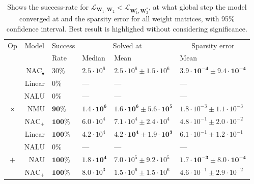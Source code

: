 \begin{table}[!h]

\caption{\label{tab:function-task-static-defaults}Shows the success-rate for $\mathcal{L}_{\mathbf{W}_1, \mathbf{W}_2} < \mathcal{L}_{\mathbf{W}_1^\epsilon, \mathbf{W}_2^*}$, at what global step the model converged at and the sparsity error for all weight matrices, with 95\% confidence interval. Best result is highlighed without considering significance.}
\centering
\begin{tabular}{crllll}
\toprule
\multicolumn{1}{c}{Op} & \multicolumn{1}{c}{Model} & \multicolumn{1}{c}{Success} & \multicolumn{2}{c}{Solved at} & \multicolumn{1}{c}{Sparsity error} \\
\cmidrule(l{3pt}r{3pt}){1-1} \cmidrule(l{3pt}r{3pt}){2-2} \cmidrule(l{3pt}r{3pt}){3-3} \cmidrule(l{3pt}r{3pt}){4-5} \cmidrule(l{3pt}r{3pt}){6-6}
 &  & Rate & Median & Mean & Mean\\
\midrule
 & $\mathrm{NAC}_{\bullet}$ & $30\%$ & $2.5 \cdot 10^{6}$ & $2.5 \cdot 10^{6} \pm 1.5 \cdot 10^{6}$ & $\mathbf{3.9 \cdot 10^{-4} \pm 9.4 \cdot 10^{-4}}$\\

 & Linear & $0\%$ & --- & --- & ---\\

 & NALU & $0\%$ & --- & --- & ---\\

\multirow{-4}{*}{\centering\arraybackslash $\bm{\times}$} & NMU & $\mathbf{90\%}$ & $\mathbf{1.4 \cdot 10^{6}}$ & $\mathbf{1.6 \cdot 10^{6} \pm 5.6 \cdot 10^{5}}$ & $1.8 \cdot 10^{-3} \pm 1.1 \cdot 10^{-3}$\\
\cmidrule{1-6}
 & $\mathrm{NAC}_{+}$ & $\mathbf{100\%}$ & $6.0 \cdot 10^{4}$ & $7.1 \cdot 10^{4} \pm 2.4 \cdot 10^{4}$ & $4.8 \cdot 10^{-1} \pm 2.0 \cdot 10^{-2}$\\

 & Linear & $\mathbf{100\%}$ & $4.2 \cdot 10^{4}$ & $\mathbf{4.2 \cdot 10^{4} \pm 1.9 \cdot 10^{3}}$ & $6.1 \cdot 10^{-1} \pm 1.2 \cdot 10^{-1}$\\

 & NALU & $0\%$ & --- & --- & ---\\

\multirow{-4}{*}{\centering\arraybackslash $\bm{+}$} & NAU & $\mathbf{100\%}$ & $\mathbf{1.8 \cdot 10^{4}}$ & $7.0 \cdot 10^{5} \pm 9.2 \cdot 10^{5}$ & $\mathbf{1.7 \cdot 10^{-3} \pm 8.0 \cdot 10^{-4}}$\\
\cmidrule{1-6}
 & $\mathrm{NAC}_{+}$ & $\mathbf{100\%}$ & $8.0 \cdot 10^{3}$ & $1.5 \cdot 10^{6} \pm 1.5 \cdot 10^{6}$ & $4.6 \cdot 10^{-1} \pm 2.9 \cdot 10^{-2}$\\


\end{tabular}
\end{table}
